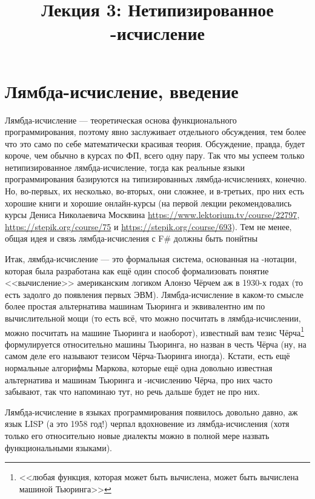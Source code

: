 \documentclass[a5paper]{article}
\title{Лекция 3: Нетипизированное \lambda-исчисление}
\date{}
\begin{document}
\maketitle
\thispagestyle{empty}

\section{Лямбда-исчисление, введение}

Лямбда-исчисление --- теоретическая основа функционального программирования, поэтому явно заслуживает отдельного обсуждения, тем более что это само по себе математически красивая теория. Обсуждение, правда, будет короче, чем обычно в курсах по ФП, всего одну пару. Так что мы успеем только нетипизированное лямбда-исчисление, тогда как реальные языки программирования базируются на типизированных лямбда-исчислениях, конечно. Но, во-первых, их несколько, во-вторых, они сложнее, и в-третьих, про них есть хорошие книги и хорошие онлайн-курсы (на первой лекции рекомендовались курсы Дениса Николаевича Москвина \url{https://www.lektorium.tv/course/22797}, \url{https://stepik.org/course/75} и \url{https://stepik.org/course/693}). Тем не менее, общая идея и связь лямбда-исчисления с F\# должны быть понйтны

Итак, лямбда-исчисление --- это формальная система, основанная на \lambda-нотации, которая была разработана как ещё один способ формализовать понятие <<вычисление>> американским логиком Алонзо Чёрчем аж в 1930-х годах (то есть задолго до появления первых ЭВМ). Лямбда-исчисление в каком-то смысле более простая альтернатива машинам Тьюринга и эквивалентно им по вычислительной мощи (то есть всё, что можно посчитать в лямбда-исчислении, можно посчитать на машине Тьюринга и наоборот), известный вам тезис Чёрча\footnote{<<любая функция, которая может быть вычислена, может быть вычислена машиной Тьюринга>>} формулируется относительно машины Тьюринга, но назван в честь Чёрча (ну, на самом деле его называют тезисом Чёрча-Тьюринга иногда). Кстати, есть ещё нормальные алгорифмы Маркова, которые ещё одна довольно известная альтернатива и машинам Тьюринга и \lambda-исчислению Чёрча, про них часто забывают, так что напоминаю тут, но речь дальше будет не про них.

Лямбда-исчисление в языках программирования появилось довольно давно, аж язык LISP (а это 1958 год!) черпал вдохновение из лямбда-исчисления (хотя только его относительно новые диалекты можно в полной мере назвать функциональными языками).
\end{document}
